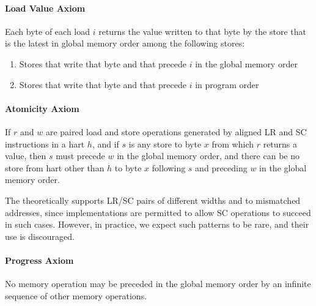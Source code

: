 \newcommand{\loadvalueaxiom}{
  Each byte of each load $i$ returns the value written to that byte by the store that is the latest in global memory order among the following stores:
  \begin{enumerate}
    \item Stores that write that byte and that precede $i$ in the global memory order
    \item Stores that write that byte and that precede $i$ in program order
  \end{enumerate}
}

\newcommand{\atomicityaxiom}{If $r$ and $w$ are paired load and store operations generated by aligned LR and SC instructions in a hart $h$, and if $s$ is any store to byte $x$ from which $r$ returns a value, then $s$ must precede $w$ in the global memory order, and there can be no store from hart other than $h$ to byte $x$ following $s$ and preceding $w$ in the global memory order.}

\newcommand{\progressaxiom}{No memory operation may be preceded in the global memory order by an infinite sequence of other memory operations.}

\paragraph{Load Value Axiom}
\label{rvwmo:ax:load}
\loadvalueaxiom

\paragraph{Atomicity Axiom}
\label{rvwmo:ax:atom}
\atomicityaxiom

\begin{commentary}
  The  theoretically supports LR/SC pairs of different widths and to mismatched addresses, since implementations are permitted to allow SC operations to succeed in such cases.  However, in practice, we expect such patterns to be rare, and their use is discouraged.
\end{commentary}

\paragraph{Progress Axiom}
\label{rvwmo:ax:prog}
\progressaxiom


